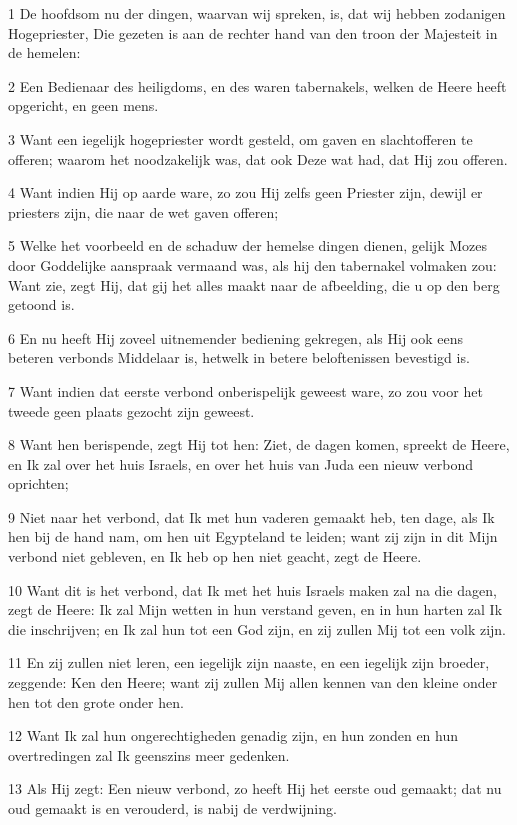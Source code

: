\par 1 De hoofdsom nu der dingen, waarvan wij spreken, is, dat wij hebben zodanigen Hogepriester, Die gezeten is aan de rechter hand van den troon der Majesteit in de hemelen:
\par 2 Een Bedienaar des heiligdoms, en des waren tabernakels, welken de Heere heeft opgericht, en geen mens.
\par 3 Want een iegelijk hogepriester wordt gesteld, om gaven en slachtofferen te offeren; waarom het noodzakelijk was, dat ook Deze wat had, dat Hij zou offeren.
\par 4 Want indien Hij op aarde ware, zo zou Hij zelfs geen Priester zijn, dewijl er priesters zijn, die naar de wet gaven offeren;
\par 5 Welke het voorbeeld en de schaduw der hemelse dingen dienen, gelijk Mozes door Goddelijke aanspraak vermaand was, als hij den tabernakel volmaken zou: Want zie, zegt Hij, dat gij het alles maakt naar de afbeelding, die u op den berg getoond is.
\par 6 En nu heeft Hij zoveel uitnemender bediening gekregen, als Hij ook eens beteren verbonds Middelaar is, hetwelk in betere beloftenissen bevestigd is.
\par 7 Want indien dat eerste verbond onberispelijk geweest ware, zo zou voor het tweede geen plaats gezocht zijn geweest.
\par 8 Want hen berispende, zegt Hij tot hen: Ziet, de dagen komen, spreekt de Heere, en Ik zal over het huis Israels, en over het huis van Juda een nieuw verbond oprichten;
\par 9 Niet naar het verbond, dat Ik met hun vaderen gemaakt heb, ten dage, als Ik hen bij de hand nam, om hen uit Egypteland te leiden; want zij zijn in dit Mijn verbond niet gebleven, en Ik heb op hen niet geacht, zegt de Heere.
\par 10 Want dit is het verbond, dat Ik met het huis Israels maken zal na die dagen, zegt de Heere: Ik zal Mijn wetten in hun verstand geven, en in hun harten zal Ik die inschrijven; en Ik zal hun tot een God zijn, en zij zullen Mij tot een volk zijn.
\par 11 En zij zullen niet leren, een iegelijk zijn naaste, en een iegelijk zijn broeder, zeggende: Ken den Heere; want zij zullen Mij allen kennen van den kleine onder hen tot den grote onder hen.
\par 12 Want Ik zal hun ongerechtigheden genadig zijn, en hun zonden en hun overtredingen zal Ik geenszins meer gedenken.
\par 13 Als Hij zegt: Een nieuw verbond, zo heeft Hij het eerste oud gemaakt; dat nu oud gemaakt is en verouderd, is nabij de verdwijning.

